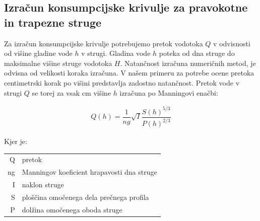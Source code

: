 \subsection{Izračun konsumpcijske krivulje za pravokotne in trapezne struge} \label{sec:teorija_trapeznaMetoda}
Za izračun konsumpcijske krivulje potrebujemo pretok vodotoka $Q$ v odvisnosti od višine gladine vode $h$ v strugi. Gladina vode $h$ poteka od dna struge do maksimalne višine struge vodotoka $H$. Natančnost izračuna numeričnih metod, je odvisna od velikosti koraka izračuna. V našem primeru za potrebe ocene pretoka centimetrski korak po višini predstavlja zadostno natančnost. Pretok vode v strugi $Q$ se torej za vsak cm višine $h$ izračuna po Manningovi enačbi: 

\begin{ceqn}
\begin{align}
Q(h) = \dfrac{1}{ng} \sqrt{I}\dfrac{S(h)^{5/3}}{P(h)^{2/3}} \label{eq:ManningovaEnacba}
\end{align}
\end{ceqn}

Kjer je:

\begin{table}[htb!]
	\begin{tabular}{r|p{10cm}}
		Q & pretok \\
		ng & Manningov koeficient hrapavosti dna struge\\
		I & naklon struge \\
		S & ploščina omočenega dela prečnega profila \\
		P & dolžina omočenega oboda struge
	\end{tabular}
\end{table}


